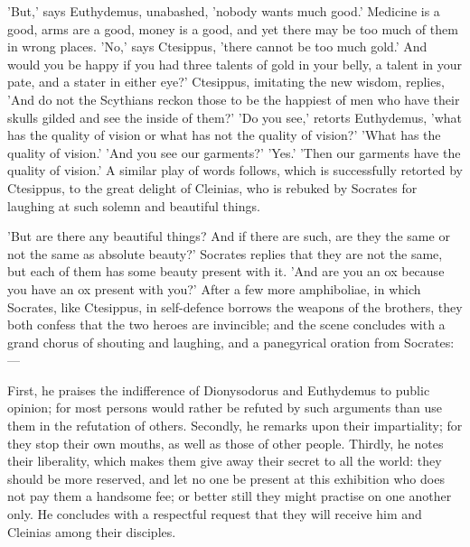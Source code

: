 \documentclass[11pt,letter]{article}
\begin{document}
\par  'But,' says Euthydemus, unabashed, 'nobody wants much good.' Medicine is a good, arms are a good, money is a good, and yet there may be too much of them in wrong places. 'No,' says Ctesippus, 'there cannot be too much gold.' And would you be happy if you had three talents of gold in your belly, a talent in your pate, and a stater in either eye?' Ctesippus, imitating the new wisdom, replies, 'And do not the Scythians reckon those to be the happiest of men who have their skulls gilded and see the inside of them?' 'Do you see,' retorts Euthydemus, 'what has the quality of vision or what has not the quality of vision?' 'What has the quality of vision.' 'And you see our garments?' 'Yes.' 'Then our garments have the quality of vision.' A similar play of words follows, which is successfully retorted by Ctesippus, to the great delight of Cleinias, who is rebuked by Socrates for laughing at such solemn and beautiful things.

\par  'But are there any beautiful things? And if there are such, are they the same or not the same as absolute beauty?' Socrates replies that they are not the same, but each of them has some beauty present with it. 'And are you an ox because you have an ox present with you?' After a few more amphiboliae, in which Socrates, like Ctesippus, in self-defence borrows the weapons of the brothers, they both confess that the two heroes are invincible; and the scene concludes with a grand chorus of shouting and laughing, and a panegyrical oration from Socrates:—

\par  First, he praises the indifference of Dionysodorus and Euthydemus to public opinion; for most persons would rather be refuted by such arguments than use them in the refutation of others. Secondly, he remarks upon their impartiality; for they stop their own mouths, as well as those of other people. Thirdly, he notes their liberality, which makes them give away their secret to all the world: they should be more reserved, and let no one be present at this exhibition who does not pay them a handsome fee; or better still they might practise on one another only. He concludes with a respectful request that they will receive him and Cleinias among their disciples.
\end{document}
